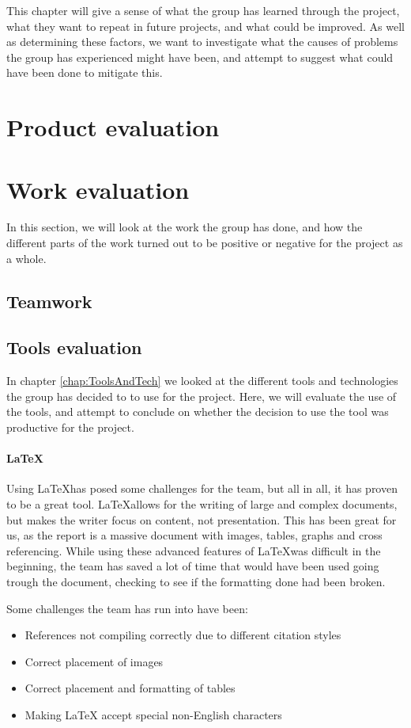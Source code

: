 \documentclass[11pt,a4paper,titlepage,oneside]{report}
\begin{document}
This chapter will give a sense of what the group has learned through the project, what they want to repeat in future projects, and what could be improved. As well as determining these factors, we want to investigate what the causes of problems the group has experienced might have been, and attempt to suggest what could have been done to mitigate this. 

\section{Product evaluation}
\section{Work evaluation}
In this section, we will look at the work the group has done, and how the different parts of the work turned out to be positive or negative for the project as a whole. 
\subsection{Teamwork}
\subsection{Tools evaluation}
In chapter \ref{chap:ToolsAndTech} we looked at the different tools and technologies the group has decided to to use for the project. Here, we will evaluate the use of the tools, and attempt to conclude on whether the decision to use the tool was productive for the project.

\paragraph{\LaTeX}
Using \LaTeX has posed some challenges for the team, but all in all, it has proven to be a great tool. \LaTeX allows for the writing of large and complex documents, but makes the writer focus on content, not presentation. This has been great for us, as the report is a massive document with images, tables, graphs and cross referencing. While using these advanced features of \LaTeX was difficult in the beginning, the team has saved a lot of time that would have been used going trough the document, checking to see if the formatting done had been broken. 

Some challenges the team has run into have been:
\begin{itemize}
\item References not compiling correctly due to different citation styles
\item Correct placement of images
\item Correct placement and formatting of tables
\item Making LaTeX accept special non-English characters
\end{itemize}
\end{document}
